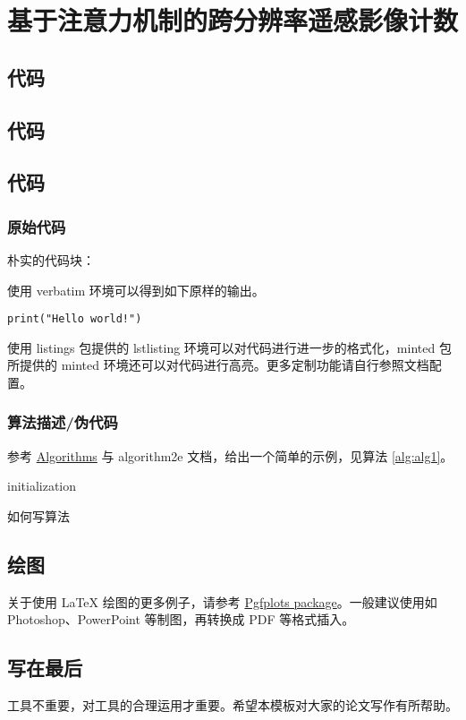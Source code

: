 
\chapter{基于注意力机制的跨分辨率遥感影像计数}
\section{}
\section{代码}
\section{代码}
\section{代码}
\subsection{原始代码}
朴实的代码块：

使用 verbatim 环境可以得到如下原样的输出。
\begin{verbatim}
print("Hello world!")
\end{verbatim}

使用 listings 包提供的 lstlisting 环境可以对代码进行进一步的格式化，minted 包所提供的 minted 环境还可以对代码进行高亮。更多定制功能请自行参照文档配置。

\subsection{算法描述/伪代码}
参考 \href{https://en.wikibooks.org/wiki/LaTeX/Algorithms}{Algorithms} 与 algorithm2e 文档，给出一个简单的示例，见算法 \ref{alg:alg1}。

\begin{algorithm}
  \SetAlgoLined
  initialization\;
  \caption{如何写算法}\label{alg:alg1}
\end{algorithm}

\section{绘图}
关于使用 \LaTeX{} 绘图的更多例子，请参考 \href{https://www.overleaf.com/learn/latex/Pgfplots_package}{Pgfplots package}。一般建议使用如 Photoshop、PowerPoint 等制图，再转换成 PDF 等格式插入。

\section{写在最后}
工具不重要，对工具的合理运用才重要。希望本模板对大家的论文写作有所帮助。
